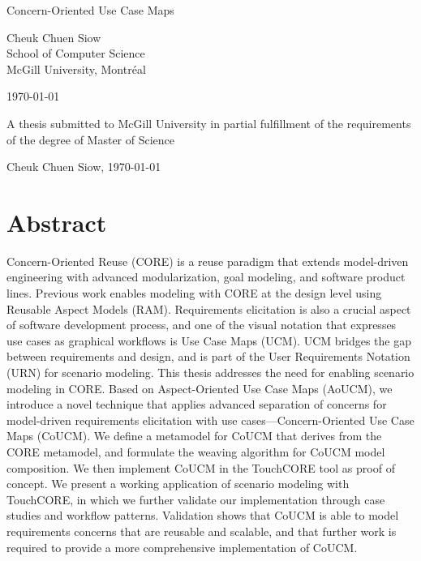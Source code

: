 \documentclass[12pt,letterpaper]{report}
\begin{document}
	
	\begin{titlepage}
		\begin{center}
			\vspace*{1in}
			
			\Huge
			Concern-Oriented Use Case Maps
			
			\vfill
			
			\large
			Cheuk Chuen Siow\\
			School of Computer Science\\
			McGill University, Montréal
			
			\vfill
			
			\monthyeardate\today
			
			\vfill
			
			A thesis submitted to McGill University in partial fulfillment of the requirements of the degree of Master of Science
			
			\vfill
			
			\textcopyright{} Cheuk Chuen Siow, \yeardate\today
			
			\vspace*{1in}
		\end{center}
	\end{titlepage}
	
	\clearpage
	\setcounter{page}{2}
	
	\chapter*{Abstract}
	
	Concern-Oriented Reuse (CORE) is a reuse paradigm that extends model-driven engineering with advanced modularization, goal modeling, and software product lines. Previous work enables modeling with CORE at the design level using Reusable Aspect Models (RAM). Requirements elicitation is also a crucial aspect of software development process, and one of the visual notation that expresses use cases as graphical workflows is Use Case Maps (UCM). UCM bridges the gap between requirements and design, and is part of the User Requirements Notation (URN) for scenario modeling. This thesis addresses the need for enabling scenario modeling in CORE. Based on Aspect-Oriented Use Case Maps (AoUCM), we introduce a novel technique that applies advanced separation of concerns for model-driven requirements elicitation with use cases---Concern-Oriented Use Case Maps (CoUCM). We define a metamodel for CoUCM that derives from the CORE metamodel, and formulate the weaving algorithm for CoUCM model composition. We then implement CoUCM in the TouchCORE tool as proof of concept. We present a working application of scenario modeling with TouchCORE, in which we further validate our implementation through case studies and workflow patterns. Validation shows that CoUCM is able to model requirements concerns that are reusable and scalable, and that further work is required to provide a more comprehensive implementation of CoUCM.
	
\end{document}
